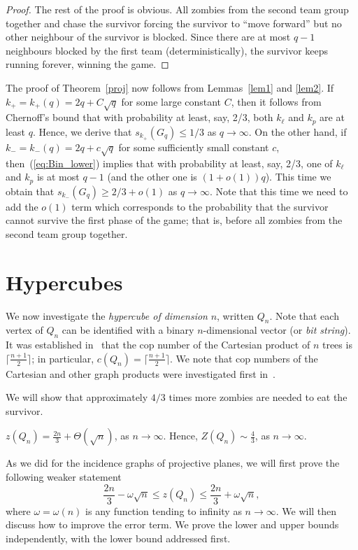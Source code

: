 \documentclass[12pt]{amsart}
\begin{document}
\begin{proof}
The rest of the proof is obvious. All zombies from the second team group together and chase the survivor forcing the survivor to ``move forward'' but no other neighbour of the survivor is blocked.
Since there are at most $q-1$ neighbours blocked by the first team (deterministically), the survivor keeps running forever, winning the game.
\end{proof}

The proof of Theorem~\ref{proj} now follows from Lemmas~\ref{lem1} and \ref{lem2}. If $k_+ = k_+(q) = 2q + C \sqrt{q}$ for some large constant $C$, then it follows from Chernoff's bound that with probability at least, say, 2/3, both $k_{\ell}$ and $k_p$ are at least $q$. Hence, we derive that $s_{k_+}(G_q) \le 1/3$ as $q \to \infty$.  On the other hand, if $k_- = k_-(q) = 2q + c \sqrt{q}$ for some sufficiently small constant $c$, then~(\ref{eq:Bin_lower}) implies that with probability at least, say, 2/3, one of $k_{\ell}$ and $k_p$ is at most $q-1$ (and the other one is $(1+o(1))q$).  This time we obtain that
$s_{k_-}(G_q) \ge 2/3+o(1)$ as $q \to \infty$. Note that this time we need to add the $o(1)$ term which corresponds to the probability that the survivor cannot survive the first phase of the game; that is, before all zombies from the second team group together.

\section{Hypercubes}\label{sechyper}

We now investigate the \emph{hypercube of dimension} $n$, written $Q_n$. Note that each vertex of $Q_n$ can be identified with a binary $n$-dimensional vector (or \emph{bit string}). It was established in~\cite{mm} that the cop
number of the Cartesian product of $n$ trees is $\lceil \frac{n+1}{2} \rceil$; in particular, $c(Q_n) = \lceil \frac{n+1}{2} \rceil$. We note that cop numbers of the Cartesian and other graph products were investigated first in~\cite{nn}. 

We will show that approximately $4/3$ times more zombies are needed to eat the survivor.


\begin{theorem}\label{hyper}
$z(Q_n) = \frac {2n}{3} + \Theta(\sqrt{n})$, as $n \to \infty$. Hence, $Z(Q_n) \sim \frac 43$, as $n \to \infty$.
\end{theorem}

\noindent
As we did for the incidence graphs of projective planes, we will first prove the following weaker statement
$$
\frac {2n}{3} - \omega\sqrt{n} \le z(Q_n) \le \frac {2n}{3} + \omega\sqrt{n},
$$
where $\omega = \omega(n)$ is any function tending to infinity as $n\to \infty$. We will then discuss how to improve the error term.  We prove the lower and upper bounds independently, with the lower bound addressed first.
\end{document}
